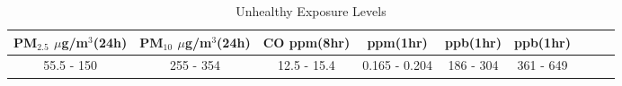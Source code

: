 \begin{table}
\centering\scriptsize
\caption{Unhealthy Exposure Levels \cite{aqi-technical-doc}}
\begin{tabular}{|c|c|c|c|c|c|c|c|c|}
\hline
	PM$_{2.5}$ $\mu$g/m$^3$(24h) & PM$_{10}$ $\mu$g/m$^3$(24h) & CO ppm(8hr) &
	\ozone ppm(1hr) & \sdo ppb(1hr) & \ndo ppb(1hr) \\ 
\hline

	55.5 - 150  & 255 - 354 & 12.5 - 15.4 & 0.165 - 0.204 & 186 - 304 & 361 - 649 \\\hline

\end{tabular}
\label{tab:gasUnhealthyExposure}
\end{table}

